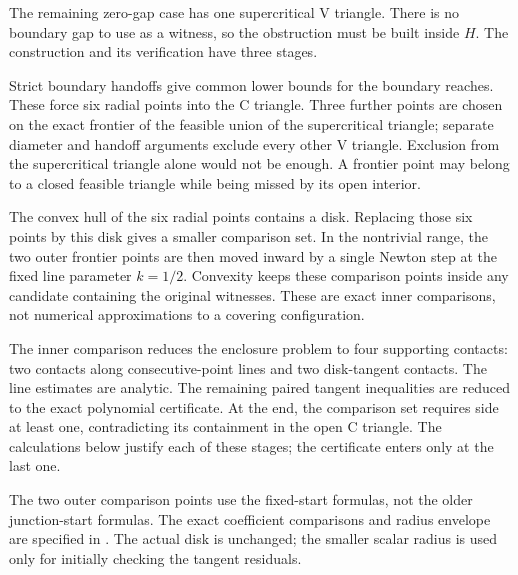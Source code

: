 The remaining zero-gap case has one supercritical V triangle. There is no
boundary gap to use as a witness, so the obstruction must be built inside
$H$. The construction and its verification have three stages.

Strict boundary handoffs give common lower bounds for the boundary reaches.
These force six radial points into the C triangle. Three further points are
chosen on the exact frontier of the feasible union of the supercritical
triangle; separate diameter and handoff arguments exclude every other V
triangle. Exclusion from the supercritical triangle alone would not be enough.
A frontier point may belong to a closed feasible triangle while being missed
by its open interior.

The convex hull of the six radial points contains a disk. Replacing those
six points by this disk gives a smaller comparison set. In the nontrivial
range, the two outer frontier points are then moved inward by a single
Newton step at the fixed line parameter $k=1/2$. Convexity keeps these comparison points inside any candidate
containing the original witnesses. These are exact inner comparisons,
not numerical approximations to a covering configuration.

The inner comparison reduces the enclosure problem to four supporting
contacts: two contacts along consecutive-point lines and two disk-tangent
contacts. The line estimates are analytic. The remaining paired tangent
inequalities are reduced to the exact polynomial certificate. At the end,
the comparison set requires side at least one, contradicting its containment
in the open C triangle. The calculations below justify each of these stages;
the certificate enters only at the last one.

The two outer comparison points use the fixed-start formulas, not the older
junction-start formulas. The exact coefficient comparisons and radius envelope
are specified in .
The actual disk is unchanged; the smaller scalar radius is used only for
initially checking the tangent residuals.
